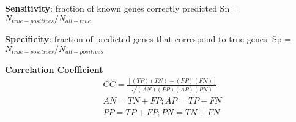 \documentclass{article}
\begin{document}
\textbf{Sensitivity}: fraction of known genes correctly predicted Sn = $N_{true-positives} / N_{all-true}$

\textbf{Specificity}: fraction of predicted genes that correspond to true genes: Sp = $N_{true-positives} / N_{all-positives}$

\textbf{Correlation Coefficient}
$$
\begin{aligned}
&C C=\frac{[(T P)(T N)-(F P)(F N)]}{\sqrt{(A N)(P P)(A P)(P N)}}\\
&A N=T N+F P ; A P=T P+F N\\
&P P=T P+F P ; P N=T N+F N
\end{aligned}
$$
\end{document}
